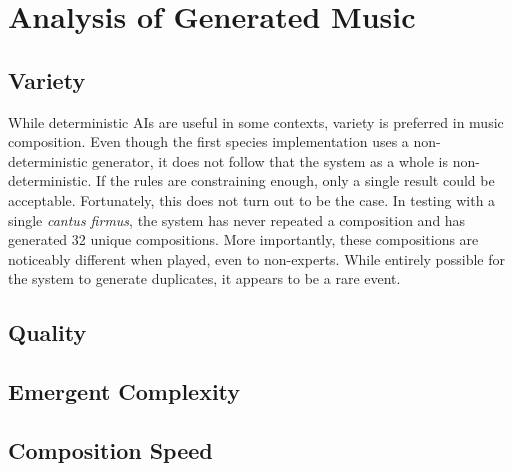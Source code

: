 \section{Analysis of Generated Music}

\subsection{Variety} 
While deterministic AIs are useful in some contexts, variety is preferred in music composition.
Even though the first species implementation uses a non-deterministic generator, it does not follow that the system as a whole is non-deterministic.
If the rules are constraining enough, only a single result could be acceptable.
Fortunately, this does not turn out to be the case.
In testing with a single \emph{cantus firmus}, the system has never repeated a composition and has generated 32 unique compositions.
More importantly, these compositions are noticeably different when played, even to non-experts.
While entirely possible for the system to generate duplicates, it appears to be a rare event.

\subsection{Quality} 

\subsection{Emergent Complexity} 

\subsection{Composition Speed} 
